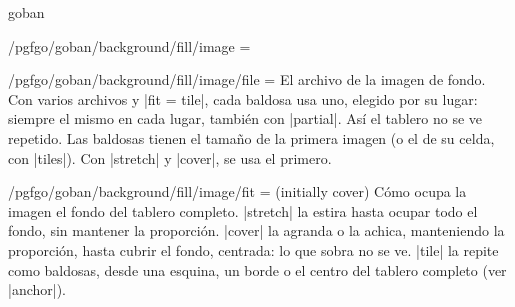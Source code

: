 \begin{environment}{{goban}}
\begin{key}{/pgfgo/goban/background/fill/image =}
		\begin{codeexample}[]
			\begin{goban}[9,
				background = {fill = {image = {file = pgfgo-board.jpg}}}]
			\end{goban}

			\begin{goban}[9, partial = A1:E5,
				background = {fill = {image = {file = pgfgo-board.jpg}},
					rounded corners = 6pt}]
			\end{goban}
		\end{codeexample}
	\end{key}

	\begin{key}{/pgfgo/goban/background/fill/image/file =}
		El archivo de la imagen de fondo. Con varios archivos y |fit = tile|, cada baldosa usa uno, elegido por su lugar: siempre el mismo en cada lugar, también con |partial|. Así el tablero no se ve repetido. Las baldosas tienen el tamaño de la primera imagen (o el de su celda, con |tiles|). Con |stretch| y |cover|, se usa el primero.

		\begin{codeexample}[]
			\begin{goban}[9, background = {fill = {image = {
				file = {pgfgo-tile.png, pgfgo-cell.png, pgfgo-board.jpg},
				fit = tile, width = 1cm}}}]
			\end{goban}
		\end{codeexample}
	\end{key}

	\begin{key}{/pgfgo/goban/background/fill/image/fit = (initially cover)}
		Cómo ocupa la imagen el fondo del tablero completo. |stretch| la estira hasta ocupar todo el fondo, sin mantener la proporción. |cover| la agranda o la achica, manteniendo la proporción, hasta cubrir el fondo, centrada: lo que sobra no se ve. |tile| la repite como baldosas, desde una esquina, un borde o el centro del tablero completo (ver |anchor|).

		\begin{codeexample}[]
			\begin{goban}[9, background = {fill = {image = {
				file = pgfgo-tile.png, fit = tile, width = 1cm}}}]
			\end{goban}

			\begin{goban}[9, partial = D4:H8, background = {fill = {image = {
				file = pgfgo-tile.png, fit = tile, width = 1cm}}}]
			\end{goban}
		\end{codeexample}
	\end{key}


\end{environment}
